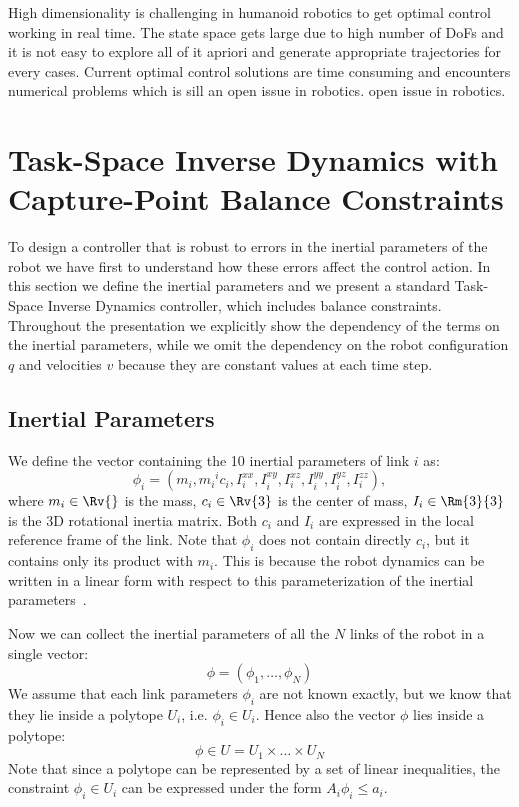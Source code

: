 High dimensionality is challenging in humanoid robotics to get optimal control working in real time. The state space gets large due to high number of DoFs and it is not easy to explore all of it apriori and generate appropriate trajectories for every cases. Current optimal control solutions are time consuming and encounters numerical problems which is sill an open issue in robotics.
open issue in robotics.


\section{Task-Space Inverse Dynamics with Capture-Point Balance Constraints}
\label{sec:tsid}
To design a controller that is robust to errors in the inertial parameters of the robot we have first to understand how these errors affect the control action.
In this section we define the inertial parameters and we present a standard Task-Space Inverse Dynamics controller, which includes balance constraints. 
Throughout the presentation we explicitly show the dependency of the terms on the inertial parameters, while we omit the dependency on the robot configuration $q$ and velocities $v$ because they are constant values at each time step.

\subsection{Inertial Parameters}
We define the vector containing the 10 inertial parameters of link $i$ as:
\begin{equation*}
\phi_i = (m_i, m_i {}^i c_i, I_i^{xx}, I_i^{xy}, I_i^{xz}, I_i^{yy}, I_i^{yz}, I_i^{zz} ),
\end{equation*}
where $m_i \in \Rv{}$ is the mass, $c_i \in \Rv{3}$ is the center of mass, $I_i \in \Rm{3}{3}$ is the 3D rotational inertia matrix.
Both $c_i$ and $I_i$ are expressed in the local reference frame of the link.
Note that $\phi_i$ does not contain directly $c_i$, but it contains only its product with $m_i$.
This is because the robot dynamics can be written in a linear form with respect to this parameterization of the inertial parameters~\cite{Traversaro2015}.

Now we can collect the inertial parameters of all the $N$ links of the robot in a single vector:
\begin{equation*}
\phi = (\phi_1, \dots, \phi_N)
\end{equation*}
We assume that each link parameters $\phi_i$ are not known exactly, but we know that they lie inside a polytope $U_i$, i.e. $\phi_i \in U_i$.
Hence also the vector $\phi$ lies inside a polytope:
$$
\phi \in U = U_1 \times \dots \times U_N
$$
Note that since a polytope can be represented by a set of linear inequalities, the constraint $\phi_i \in U_i$ can be expressed under the form $A_i \phi_i \le a_i$. 

